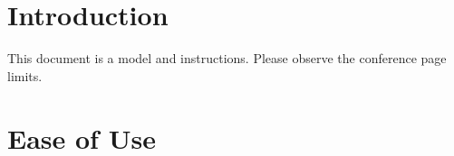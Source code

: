 \section{Introduction}
This document is a model and instructions.
Please observe the conference page limits. \cite{bar}

\section{Ease of Use}
